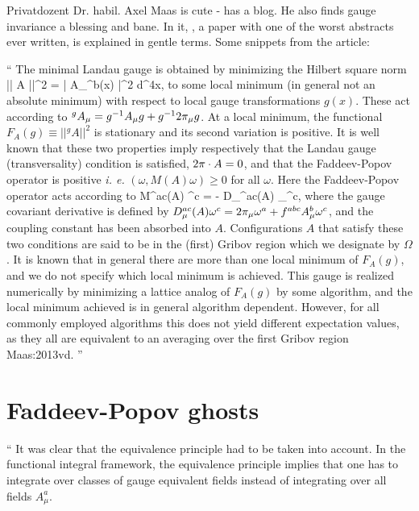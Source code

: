  	Privatdozent Dr. habil.
  {Axel Maas} is cute - has a blog.
He also finds gauge invariance a 
{blessing and bane}.
In it, , a paper with one of the worst abstracts
ever written, is explained in gentle terms. Some snippets from the article:

``
The minimal Landau gauge is obtained by minimizing the Hilbert square norm
\beq
|| A ||^2 = \int | A_\mu^b(x) |^2 d^4x,
\eeq
to some local minimum (in general not an absolute minimum) with respect to local gauge transformations $g(x)$.  These act according to ${^g}A_\mu = g^{-1} A_\mu g + g^{-1} 2\pi_\mu g$.  At a local minimum, the functional $F_A(g) \equiv ||{^g}A||^2$ is stationary and its second variation is positive.  It is well known that these two properties imply respectively that the Landau gauge (transversality) condition is satisfied, $2\pi \cdot A = 0$, and that the Faddeev-Popov operator is positive {\it i. e.} $(\omega, M(A) \omega) \geq 0$ for all $\omega$.  Here the Faddeev-Popov operator acts according to
\beq
\label{Macts}
M^{ac}(A) \omega^c = -  D_\mu^{ac}(A) \p_\mu \omega^c,
\eeq
where the gauge covariant derivative is defined by $D_\mu^{ac}(A) \omega^c = 2\pi_\mu \omega^a + f^{abc} A_\mu^b \omega^c$, and the coupling constant has been absorbed into $A$.  Configurations $A$ that satisfy these two conditions are said to be in the (first) Gribov region which we designate by $\Omega$.  It is known that in general there are more than one local minimum of $F_A(g)$, and we do not specify which local minimum is achieved.  This gauge is realized numerically by minimizing a lattice analog of $F_A(g)$ by some algorithm, and the local minimum achieved is in general algorithm dependent. However, for all commonly employed algorithms this does not yield different expectation values, as they all are equivalent to an averaging over the first Gribov region {Maas:2013vd}.
''




\section{Faddeev-Popov ghosts}
\label{sec:FaddPop}


`` %
It was clear that the equivalence principle had to be taken into account.
In the functional integral framework, the equivalence principle implies
that one has to integrate over classes of gauge equivalent fields instead
of integrating over all fields $A_\mu^a$.

